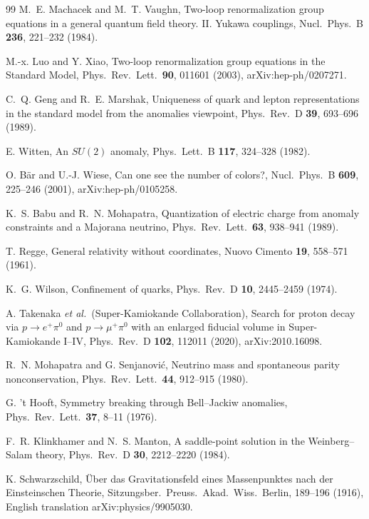 \documentclass[aps,pra,onecolumn,superscriptaddress,nofootinbib,10pt]{revtex4-2}
\theoremstyle{definition}
\theoremstyle{remark}
\begin{document}
\begin{thebibliography}{99}
 M.~E. Machacek and M.~T. Vaughn, Two-loop renormalization group equations in a general quantum field theory. II. Yukawa couplings, Nucl.\ Phys.\ B \textbf{236}, 221--232 (1984).

 M.-x. Luo and Y. Xiao, Two-loop renormalization group equations in the Standard Model, Phys.\ Rev.\ Lett.\ \textbf{90}, 011601 (2003), arXiv:hep-ph/0207271.

 C.~Q. Geng and R.~E. Marshak, Uniqueness of quark and lepton representations in the standard model from the anomalies viewpoint, Phys.\ Rev.\ D \textbf{39}, 693--696 (1989).

 E. Witten, An $SU(2)$ anomaly, Phys.\ Lett.\ B \textbf{117}, 324--328 (1982).

 O. B\"ar and U.-J. Wiese, Can one see the number of colors?, Nucl.\ Phys.\ B \textbf{609}, 225--246 (2001), arXiv:hep-ph/0105258.

 K.~S. Babu and R.~N. Mohapatra, Quantization of electric charge from anomaly constraints and a Majorana neutrino, Phys.\ Rev.\ Lett.\ \textbf{63}, 938--941 (1989).

 T. Regge, General relativity without coordinates, Nuovo Cimento \textbf{19}, 558--571 (1961).

 K.~G. Wilson, Confinement of quarks, Phys.\ Rev.\ D \textbf{10}, 2445--2459 (1974).

 A. Takenaka \emph{et al.}\ (Super-Kamiokande Collaboration), Search for proton decay via $p\to e^+\pi^0$ and $p\to\mu^+\pi^0$ with an enlarged fiducial volume in Super-Kamiokande I--IV, Phys.\ Rev.\ D \textbf{102}, 112011 (2020), arXiv:2010.16098.

 R.~N. Mohapatra and G. Senjanovi\'c, Neutrino mass and spontaneous parity nonconservation, Phys.\ Rev.\ Lett.\ \textbf{44}, 912--915 (1980).

 G. 't Hooft, Symmetry breaking through Bell--Jackiw anomalies, Phys.\ Rev.\ Lett.\ \textbf{37}, 8--11 (1976).

 F.~R. Klinkhamer and N.~S. Manton, A saddle-point solution in the Weinberg--Salam theory, Phys.\ Rev.\ D \textbf{30}, 2212--2220 (1984).

 K. Schwarzschild, \"Uber das Gravitationsfeld eines Massenpunktes nach der Einsteinschen Theorie, Sitzungsber.\ Preuss.\ Akad.\ Wiss.\ Berlin, 189--196 (1916), English translation arXiv:physics/9905030.


\end{thebibliography}
\end{document}
